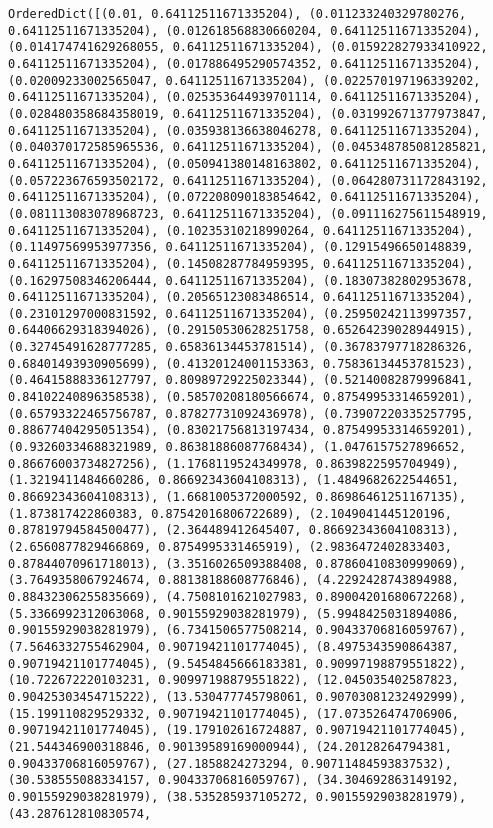 \documentclass[11pt]{article}
\begin{document}
    \begin{Verbatim}[commandchars=\\\{\}]
OrderedDict([(0.01, 0.64112511671335204), (0.011233240329780276, 0.64112511671335204), (0.012618568830660204, 0.64112511671335204), (0.014174741629268055, 0.64112511671335204), (0.015922827933410922, 0.64112511671335204), (0.017886495290574352, 0.64112511671335204), (0.02009233002565047, 0.64112511671335204), (0.022570197196339202, 0.64112511671335204), (0.025353644939701114, 0.64112511671335204), (0.028480358684358019, 0.64112511671335204), (0.031992671377973847, 0.64112511671335204), (0.035938136638046278, 0.64112511671335204), (0.040370172585965536, 0.64112511671335204), (0.045348785081285821, 0.64112511671335204), (0.050941380148163802, 0.64112511671335204), (0.057223676593502172, 0.64112511671335204), (0.064280731172843192, 0.64112511671335204), (0.072208090183854642, 0.64112511671335204), (0.081113083078968723, 0.64112511671335204), (0.091116275611548919, 0.64112511671335204), (0.10235310218990264, 0.64112511671335204), (0.11497569953977356, 0.64112511671335204), (0.12915496650148839, 0.64112511671335204), (0.14508287784959395, 0.64112511671335204), (0.16297508346206444, 0.64112511671335204), (0.18307382802953678, 0.64112511671335204), (0.20565123083486514, 0.64112511671335204), (0.23101297000831592, 0.64112511671335204), (0.25950242113997357, 0.64406629318394026), (0.29150530628251758, 0.65264239028944915), (0.32745491628777285, 0.65836134453781514), (0.36783797718286326, 0.68401493930905699), (0.41320124001153363, 0.75836134453781523), (0.46415888336127797, 0.80989729225023344), (0.52140082879996841, 0.84102240896358538), (0.58570208180566674, 0.87549953314659201), (0.65793322465756787, 0.87827731092436978), (0.73907220335257795, 0.88677404295051354), (0.83021756813197434, 0.87549953314659201), (0.93260334688321989, 0.86381886087768434), (1.0476157527896652, 0.86676003734827256), (1.1768119524349978, 0.8639822595704949), (1.3219411484660286, 0.86692343604108313), (1.4849682622544651, 0.86692343604108313), (1.6681005372000592, 0.86986461251167135), (1.873817422860383, 0.87542016806722689), (2.1049041445120196, 0.87819794584500477), (2.364489412645407, 0.86692343604108313), (2.6560877829466869, 0.8754995331465919), (2.9836472402833403, 0.87844070961718013), (3.3516026509388408, 0.87860410830999069), (3.7649358067924674, 0.88138188608776846), (4.2292428743894988, 0.88432306255835669), (4.7508101621027983, 0.89004201680672268), (5.3366992312063068, 0.90155929038281979), (5.9948425031894086, 0.90155929038281979), (6.7341506577508214, 0.90433706816059767), (7.5646332755462904, 0.90719421101774045), (8.4975343590864387, 0.90719421101774045), (9.5454845666183381, 0.90997198879551822), (10.722672220103231, 0.90997198879551822), (12.045035402587823, 0.90425303454715222), (13.530477745798061, 0.90703081232492999), (15.199110829529332, 0.90719421101774045), (17.073526474706906, 0.90719421101774045), (19.179102616724887, 0.90719421101774045), (21.544346900318846, 0.90139589169000944), (24.20128264794381, 0.90433706816059767), (27.1858824273294, 0.90711484593837532), (30.538555088334157, 0.90433706816059767), (34.304692863149192, 0.90155929038281979), (38.535285937105272, 0.90155929038281979), (43.287612810830574, 
\end{Verbatim}
\end{document}
